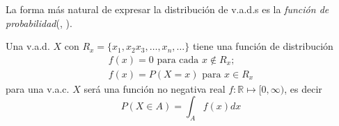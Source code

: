 \begin{displayquote}
La forma más natural de expresar la distribución de v.a.d.s es la \emph{función de probabilidad}(\citeauthor{blitz19}, \citeyear{blitz19}).
\end{displayquote}
Una v.a.d. $X$ con $R_x=\{x_1,x_2x_3,\ldots,x_n,\ldots\}$ tiene una función de distribución
\begin{equation}
\begin{matrix}
f(x)=0\text{ para cada }x \notin R_x\text{;}\\
f(x)=P(X=x)\text{ para } x\in R_x
\end{matrix}\label{eq:FP}
\end{equation}
para una v.a.c. $X$ será una función no negativa real $f:\mathbb{R}\mapsto[0,\infty)$, es decir
\begin{equation}
P(X\in A)=\int_{A}f(x)dx
\end{equation}
